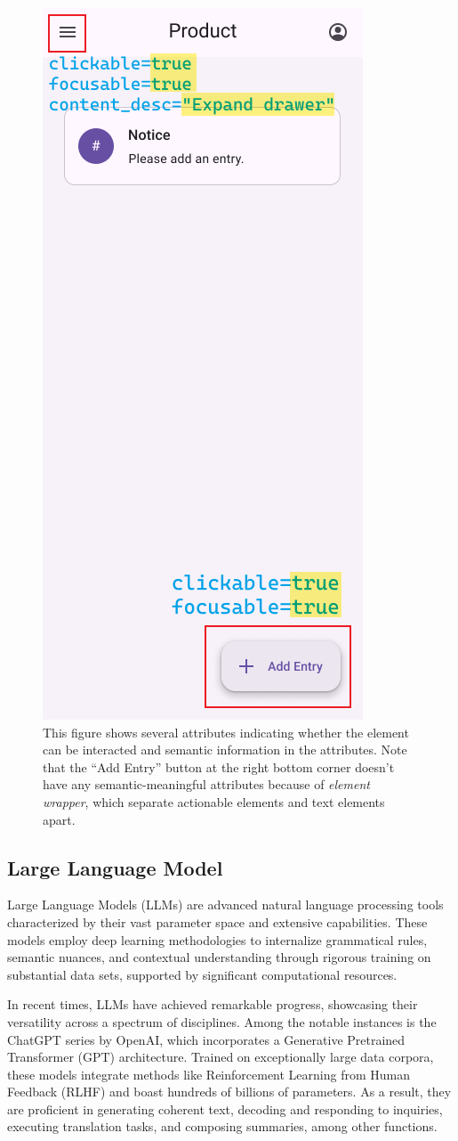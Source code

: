 \documentclass[conference]{IEEEtran}
\begin{document}
\begin{figure}
    \centering
    \includegraphics[width=0.5\linewidth]{assets/AppUI-FAB-attrs.png}
    \caption{This figure shows several attributes indicating whether the element can be interacted and semantic information in the attributes. Note that the ``Add Entry'' button at the right bottom corner doesn't have any semantic-meaningful attributes because of \textit{element wrapper}, which separate actionable elements and text elements apart.}
    \label{image-attrs-in-element-xml}
\end{figure}

\subsection{Large Language Model}
Large Language Models (LLMs) are advanced natural language processing tools characterized by their vast parameter space and extensive capabilities. These models employ deep learning methodologies\cite{DeepLearning} to internalize grammatical rules, semantic nuances, and contextual understanding through rigorous training on substantial data sets, supported by significant computational resources.

In recent times, LLMs have achieved remarkable progress, showcasing their versatility across a spectrum of disciplines. Among the notable instances is the ChatGPT series by OpenAI, which incorporates a Generative Pretrained Transformer (GPT)\cite{vaswani2017attention}\cite{brown2020language} architecture. Trained on exceptionally large data corpora, these models integrate methods like Reinforcement Learning from Human Feedback (RLHF)\cite{ouyang2022training} and boast hundreds of billions of parameters. As a result, they are proficient in generating coherent text, decoding and responding to inquiries, executing translation tasks, and composing summaries, among other functions.
\end{document}
